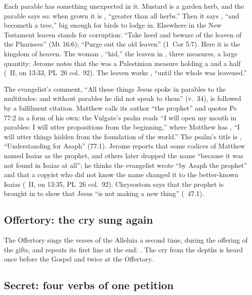 Each parable has something unexpected in it. Mustard is a garden herb,
and the parable says so: when grown it is , ``greater than all herbs.'' Then it says , ``and
becometh a tree,'' big enough for birds to lodge in. Elsewhere in the New
Testament leaven stands for corruption: ``Take heed and beware of the leaven
of the Pharisees'' (Mt 16:6); ``Purge out the old leaven'' (1~Cor 5:7). Here
it is the kingdom of heaven. The woman , ``hid,'' the leaven
in , three measures, a large quantity: Jerome notes that
the  was a Palestinian measure holding a  and a half
(~II, on 13:33, PL~26 col.~92). The leaven works
, ``until the whole was leavened.''

The evangelist's comment, ``All these things Jesus spoke in parables to the
multitudes: and without parables he did not speak to them'' (v.~34), is
followed by a fulfilment citation. Matthew calls its author ``the prophet''
and quotes Ps 77:2 in a form of his own: the Vulgate's psalm reads ``I will
open my mouth in parables: I will utter propositions from the beginning,''
where Matthew has , ``I will
utter things hidden from the foundation of the world.'' The psalm's title is
, ``Understanding for Asaph'' (77:1). Jerome reports
that some codices of Matthew named Isaias as the prophet, and others later
dropped the name ``because it was not found in Isaias at all''; he thinks the
evangelist wrote ``by Asaph the prophet'' and that a copyist who did not know
the name changed it to the better-known Isaias (~II, on
13:35, PL~26 col.~92). Chrysostom says that the prophet is brought in to
show that Jesus ``is not making a new thing'' (~47.1).

\subsection{Offertory: the cry sung again}
\label{sec:element-offertory}

The Offertory sings the verses of the Alleluia a second time, during the
offering of the gifts, and repeats its first line at the end: . The cry from the depths is heard once before
the Gospel and twice at the Offertory.

\subsection{Secret: four verbs of one petition}
\label{sec:element-secret}

